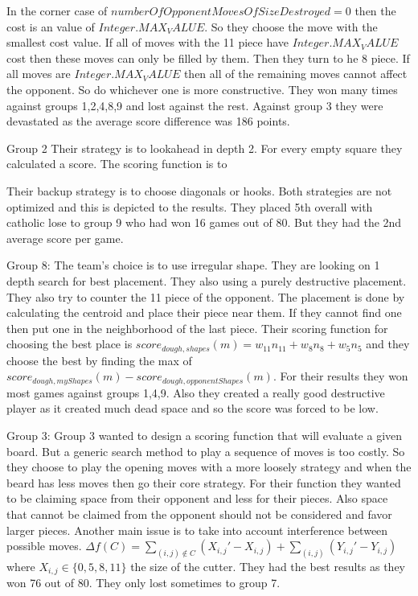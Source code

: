 In the corner case of $numberOfOpponentMovesOfSizeDestroyed = 0$ then the cost 
is an value of $Integer.MAX_VALUE$. So they choose the move with the smallest cost
value. If all of moves with the 11 piece have $Integer.MAX_VALUE$ cost then these
moves can only be filled by them. Then they turn to he 8 piece. If all moves are
$Integer.MAX_VALUE$ then all of the remaining moves cannot affect the opponent.
So do whichever one is more constructive. They won many times against groups 
1,2,4,8,9 and lost against the rest. Against group 3 they were devastated as the
average score difference was 186 points. 

Group 2
Their strategy is to lookahead in depth 2. For every empty square they calculated
a score. The scoring function is to  

Their backup strategy is to choose diagonals or hooks. Both strategies are not 
optimized and this is depicted to the results. They placed 5th overall with
catholic lose to group 9 who had won 16 games out of 80. But they had the 2nd
average score per game.

Group 8:
The team's choice is to use irregular shape. They are looking on 1 depth search
for best placement. They also using a purely destructive placement. They also 
try to counter the 11 piece of the opponent. The placement is done by calculating
the centroid and place their piece near them. If they cannot find one then put 
one in the neighborhood of the last piece. Their scoring function for choosing 
the best place is $score_{dough,shapes}(m) = w_{11}n_{11} + w_8n_8 + w_5n_5$ and
they choose the best by finding the max of $score_{dough,myShapes}(m) - 
score_{dough,opponentShapes}(m)$. For their results they won most games against
groups 1,4,9. Also they created a really good destructive player as it created
much dead space and so the score was forced to be low.

Group 3:
Group 3 wanted to design a scoring function that will evaluate a given board.
But a generic search method to play a sequence of moves is too costly. So they 
choose to play the opening moves with a more loosely strategy and when the beard
has less moves then go their core strategy. For their function they wanted to be 
claiming space from their opponent and less for their pieces. Also space that 
cannot be claimed from the opponent should not be considered and favor larger 
pieces. Another main issue is to take into account interference between possible
moves. 
$\Delta f(C) = \sum\limits_{(i,j)\notin C} (X_{i,j}' - X_{i,j}) + \sum\limits_{(i,j)} (Y_{i,j}' - Y_{i,j})$ 
where $X_{i,j} \in \{0,5,8,11\}$ the size of the cutter. They had the best results
as they won 76 out of 80. They only lost sometimes to group 7.

